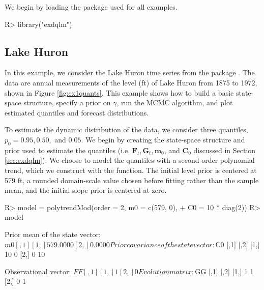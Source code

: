 \documentclass{jss}
\newcommand{\mat}[1]{\mathbf{#1}}
\begin{document}
We begin by loading the  package used for all examples.

\begin{CodeChunk}
\begin{CodeInput}
R> library("exdqlm")
\end{CodeInput}
\end{CodeChunk}


\subsection{Lake Huron}
\label{sec:ex1}

In this example, we consider the Lake Huron time series from the package . The data are annual measurements of the level (ft) of Lake Huron from 1875 to 1972, shown in Figure \ref{fig:ex1quants}. This example shows how to build a basic state-space structure, specify a prior on $\gamma$, run the MCMC algorithm, and plot estimated quantiles and forecast distributions.

To estimate the dynamic distribution of the data, we consider three quantiles, $p_0=0.95,0.50,$ and $0.05$. We begin by creating the state-space structure and prior used to estimate the quantiles (i.e. $\mat{F}_t,\mat{G}_t, \mat{m}_0$, and $\mat{C}_0$ discussed in Section \ref{sec:exdqlm}). We choose to model the quantiles with a second order polynomial trend, which we construct with the  function. The initial level prior is centered at 579 ft, a rounded domain-scale value chosen before fitting rather than the sample mean, and the initial slope prior is centered at zero.

\begin{CodeChunk}
\begin{CodeInput}
R> model = polytrendMod(order = 2, m0 = c(579, 0),
+                      C0 = 10 * diag(2))
R> model
\end{CodeInput}
\begin{CodeOutput}
Prior mean of the state vector:
$m0
         [,1]
[1,] 579.0000
[2,]   0.0000


Prior covariance of the state vector:
$C0
     [,1] [,2]
[1,]   10    0
[2,]    0   10


Observational vector:
$FF
     [,1]
[1,]    1
[2,]    0


Evolution matrix:
$GG
     [,1] [,2]
[1,]    1    1
[2,]    0    1
\end{CodeOutput}
\end{CodeChunk}
\end{document}
